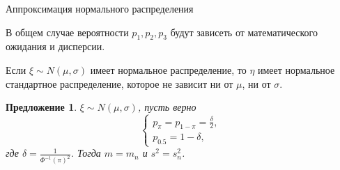 \documentclass[ucs, notheorems, handout]{beamer}
\newtheorem{proposition}[theorem]{Предложение}
\begin{document}
	\begin{frame}{Аппроксимация нормального распределения}
		
		
			В общем случае вероятности $p_{1}, p_{2}, p_{3}$ будут зависеть от математического ожидания и дисперсии.
			
			\bigskip
			
			Если $\xi\sim N(\mu, \sigma) $ имеет нормальное распределение, то
			$\eta $ имеет нормальное стандартное распределение, которое не зависит ни от $\mu$, ни от $\sigma$.
	
		
		\begin{proposition}\label{pr7}
			$\xi\sim N(\mu, \sigma)$, пусть верно 
			\begin{equation*}
				\begin{cases}
					p_{\pi} = p_{1-\pi}=\displaystyle{\frac{\delta}{2}},\\ 
					p_{0.5}=1-\delta,
				\end{cases}\label{7}
			\end{equation*}
			где $\delta  = \displaystyle{\frac{1}{\Phi ^{-1}(\pi)^{2}}}$. Тогда $m=m_{n}$ и $s^{2} = s_{n}^{2}$.
		\end{proposition}
	\end{frame}
	
\end{document}
